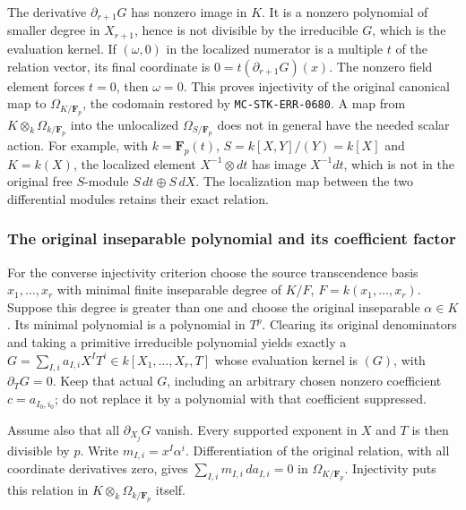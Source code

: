 The derivative \(\partial_{r+1}G\) has nonzero image in \(K\). It is a nonzero polynomial of smaller degree in \(X_{r+1}\), hence is not divisible by the irreducible \(G\), which is the evaluation kernel. If \((\omega,0)\) in the localized numerator is a multiple \(t\) of the relation vector, its final coordinate is \(0=t(\partial_{r+1}G)(x)\). The nonzero field element forces \(t=0\), then \(\omega=0\). This proves injectivity of the original canonical map to \(\Omega_{K/\mathbf F_p}\), the codomain restored by \texttt{MC-STK-ERR-0680}. A map from \(K\otimes_k\Omega_{k/\mathbf F_p}\) into the unlocalized \(\Omega_{S/\mathbf F_p}\) does not in general have the needed scalar action. For example, with \(k=\mathbf F_p(t)\), \(S=k[X,Y]/(Y)=k[X]\) and \(K=k(X)\), the localized element \(X^{-1}\otimes dt\) has image \(X^{-1}dt\), which is not in the original free \(S\)-module \(S\,dt\oplus S\,dX\). The localization map between the two differential modules retains their exact relation.

\subsubsection{The original inseparable polynomial and its coefficient factor}\label{algebra-proof-063-the-original-inseparable-polynomial-and-its-coefficient-factor}

For the converse injectivity criterion choose the source transcendence basis \(x_1,\ldots,x_r\) with minimal finite inseparable degree of \(K/F\), \(F=k(x_1,\ldots,x_r)\). Suppose this degree is greater than one and choose the original inseparable \(\alpha\in K\). Its minimal polynomial is a polynomial in \(T^p\). Clearing its original denominators and taking a primitive irreducible polynomial yields exactly a \(G=\sum_{I,i} a_{I,i}X^IT^i\in k[X_1,\ldots,X_r,T]\) whose evaluation kernel is \((G)\), with \(\partial_TG=0\). Keep that actual \(G\), including an arbitrary chosen nonzero coefficient \(c=a_{I_0,i_0}\); do not replace it by a polynomial with that coefficient suppressed.

Assume also that all \(\partial_{X_j}G\) vanish. Every supported exponent in \(X\) and \(T\) is then divisible by \(p\). Write \(m_{I,i}=x^I\alpha^i\). Differentiation of the original relation, with all coordinate derivatives zero, gives \(\sum_{I,i}m_{I,i}\,da_{I,i}=0\) in \(\Omega_{K/\mathbf F_p}\). Injectivity puts this relation in \(K\otimes_k\Omega_{k/\mathbf F_p}\) itself.


